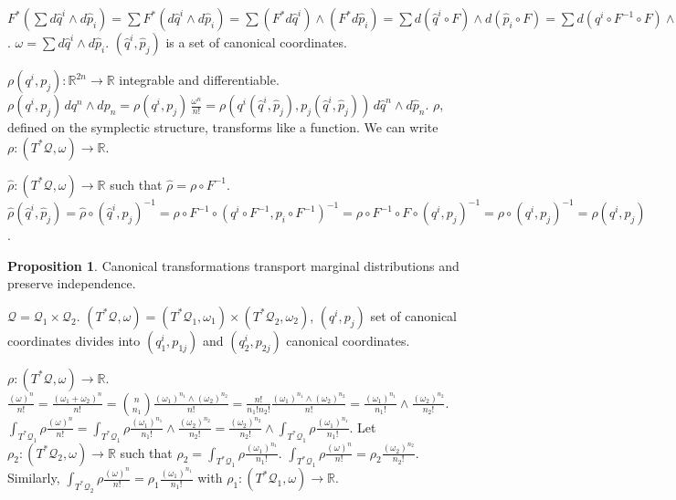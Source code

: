 \documentclass[smallextended]{svjour3}
\numberwithin{equation}{section}
\theoremstyle{definition}
\newtheorem{prop}[equation]{Proposition}
\begin{document}
$F^* (\sum d\hat{q}^i \wedge d\hat{p}_i) =\sum F^* (d\hat{q}^i \wedge d\hat{p}_i) =  \sum (F^* d\hat{q}^i)\wedge (F^* d\hat{p}_i) = \sum d(\hat{q}^i \circ F)\wedge d(\hat{p}_i \circ F) = \sum d(q^i \circ F^{-1} \circ F)\wedge d(p_i \circ F^{-1} \circ F) = \sum dq^i\wedge dp_i = \omega = F^* \omega$. $\omega =  \sum d\hat{q}^i \wedge d\hat{p}_i$. $(\hat{q}^i, \hat{p}_j)$ is a set of canonical coordinates.

$\rho(q^i, p_j) : \mathbb{R}^{2n} \rightarrow \mathbb{R}$ integrable and differentiable. $\rho (q^i, p_j) \, dq^n \wedge dp_n = \rho (q^i, p_j) \, \frac{\omega^n}{n!} = \rho (q^i(\hat{q}^i, \hat{p}_j), p_j(\hat{q}^i, \hat{p}_j)) \, d\hat{q}^n \wedge d\hat{p}_n$. $\rho$, defined on the symplectic structure, transforms like a function. We can write $\rho : (T^*\mathcal{Q}, \omega) \rightarrow \mathbb{R}$.

$\hat{\rho} : (T^*\mathcal{Q}, \omega) \rightarrow \mathbb{R}$ such that $\hat{\rho} = \rho \circ F^{-1 }$. $\hat{\rho}(\hat{q}^i, \hat{p}_j) = \hat{\rho} \circ (\hat{q}^i, \hat{p}_j)^{-1} = \rho \circ F^{-1} \circ (q^i \circ F^{-1}, p_i \circ F^{-1}) ^ {-1}= \rho \circ F^{-1} \circ F \circ (q^i, p_j) ^ {-1} = \rho \circ (q^i, p_j) ^ {-1} = \rho (q^i, p_j)$.

\begin{prop}
	Canonical transformations transport marginal distributions and preserve independence.
\end{prop}

$\mathcal{Q} = \mathcal{Q}_1 \times \mathcal{Q}_2$. $(T^*\mathcal{Q}, \omega)= (T^*\mathcal{Q}_1, \omega_1) \times (T^*\mathcal{Q}_2, \omega_2)$, $(q^i, p_j)$ set of canonical coordinates divides into $(q_1^i, p_{1j})$ and $(q_2^i, p_{2j})$ canonical coordinates.

$\rho : (T^*\mathcal{Q}, \omega) \rightarrow \mathbb{R}$. $\frac{(\omega)^n}{n!} = \frac{(\omega_1 + \omega_2)^n}{n!} = {n \choose n_1} \frac{(\omega_1)^{n_1} \wedge (\omega_2)^{n_2}}{n!} = \frac{n!}{n_1!n_2!}\frac{(\omega_1)^{n_1} \wedge (\omega_2)^{n_2}}{n!} = \frac{(\omega_1)^{n_1}}{n_1!} \wedge \frac{(\omega_2)^{n_2}}{n_2!} $. $\int_{T^*\mathcal{Q_1}}\rho \frac{(\omega)^n}{n!} = \int_{T^*\mathcal{Q_1}}\rho \frac{(\omega_1)^{n_1}}{n_1!} \wedge \frac{(\omega_2)^{n_2}}{n_2!} = \frac{(\omega_2)^{n_2}}{n_2!} \wedge \int_{T^*\mathcal{Q_1}}\rho \frac{(\omega_1)^{n_1}}{n_1!}$. Let $\rho_2 : (T^*\mathcal{Q}_2, \omega) \rightarrow \mathbb{R}$ such that $\rho_2 = \int_{T^*\mathcal{Q_1}}\rho \frac{(\omega_1)^{n_1}}{n_1!}$. $\int_{T^*\mathcal{Q_1}}\rho \frac{(\omega)^n}{n!} = \rho_2 \frac{(\omega_2)^{n_2}}{n_2!}$. Similarly, $\int_{T^*\mathcal{Q_2}}\rho \frac{(\omega)^n}{n!} = \rho_1 \frac{(\omega_1)^{n_1}}{n_1!}$ with $\rho_1 : (T^*\mathcal{Q}_1, \omega) \rightarrow \mathbb{R}$.
\end{document}
